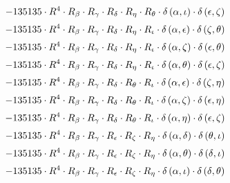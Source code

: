 \begin{subequations}
\begin{gather}
 \\[0.2em] \notag 		 - 135135 \cdot R^{4} \cdot R_{\beta{}} \cdot R_{\gamma{}} \cdot R_{\delta{}} \cdot R_{\eta{}} \cdot R_{\theta{}} \cdot \delta{}\left(\alpha{}, \iota{}\right) \cdot \delta{}\left(\epsilon{}, \zeta{}\right) 
 \\[0.2em] \notag 		 - 135135 \cdot R^{4} \cdot R_{\beta{}} \cdot R_{\gamma{}} \cdot R_{\delta{}} \cdot R_{\eta{}} \cdot R_{\iota{}} \cdot \delta{}\left(\alpha{}, \epsilon{}\right) \cdot \delta{}\left(\zeta{}, \theta{}\right) 
 \\[0.2em] \notag 		 - 135135 \cdot R^{4} \cdot R_{\beta{}} \cdot R_{\gamma{}} \cdot R_{\delta{}} \cdot R_{\eta{}} \cdot R_{\iota{}} \cdot \delta{}\left(\alpha{}, \zeta{}\right) \cdot \delta{}\left(\epsilon{}, \theta{}\right) 
 \\[0.2em] \notag 		 - 135135 \cdot R^{4} \cdot R_{\beta{}} \cdot R_{\gamma{}} \cdot R_{\delta{}} \cdot R_{\eta{}} \cdot R_{\iota{}} \cdot \delta{}\left(\alpha{}, \theta{}\right) \cdot \delta{}\left(\epsilon{}, \zeta{}\right) 
 \\[0.2em] \notag 		 - 135135 \cdot R^{4} \cdot R_{\beta{}} \cdot R_{\gamma{}} \cdot R_{\delta{}} \cdot R_{\theta{}} \cdot R_{\iota{}} \cdot \delta{}\left(\alpha{}, \epsilon{}\right) \cdot \delta{}\left(\zeta{}, \eta{}\right) 
 \\[0.2em] \notag 		 - 135135 \cdot R^{4} \cdot R_{\beta{}} \cdot R_{\gamma{}} \cdot R_{\delta{}} \cdot R_{\theta{}} \cdot R_{\iota{}} \cdot \delta{}\left(\alpha{}, \zeta{}\right) \cdot \delta{}\left(\epsilon{}, \eta{}\right) 
 \\[0.2em] \notag 		 - 135135 \cdot R^{4} \cdot R_{\beta{}} \cdot R_{\gamma{}} \cdot R_{\delta{}} \cdot R_{\theta{}} \cdot R_{\iota{}} \cdot \delta{}\left(\alpha{}, \eta{}\right) \cdot \delta{}\left(\epsilon{}, \zeta{}\right) 
 \\[0.2em] \notag 		 - 135135 \cdot R^{4} \cdot R_{\beta{}} \cdot R_{\gamma{}} \cdot R_{\epsilon{}} \cdot R_{\zeta{}} \cdot R_{\eta{}} \cdot \delta{}\left(\alpha{}, \delta{}\right) \cdot \delta{}\left(\theta{}, \iota{}\right) 
 \\[0.2em] \notag 		 - 135135 \cdot R^{4} \cdot R_{\beta{}} \cdot R_{\gamma{}} \cdot R_{\epsilon{}} \cdot R_{\zeta{}} \cdot R_{\eta{}} \cdot \delta{}\left(\alpha{}, \theta{}\right) \cdot \delta{}\left(\delta{}, \iota{}\right) 
 \\[0.2em] \notag 		 - 135135 \cdot R^{4} \cdot R_{\beta{}} \cdot R_{\gamma{}} \cdot R_{\epsilon{}} \cdot R_{\zeta{}} \cdot R_{\eta{}} \cdot \delta{}\left(\alpha{}, \iota{}\right) \cdot \delta{}\left(\delta{}, \theta{}\right) 

\end{gather}
\end{subequations}

